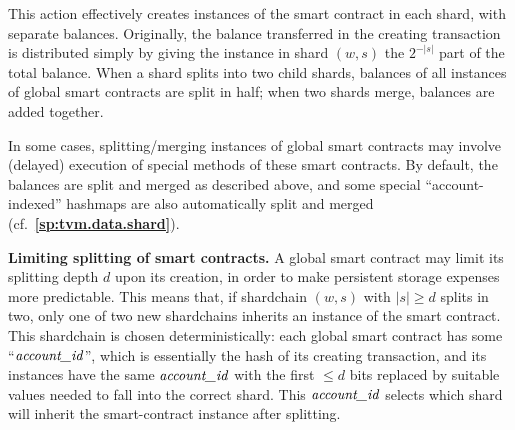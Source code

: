 \documentclass[12pt,oneside]{article}
\def\makepoint#1{\medbreak\noindent{\bf #1.\ }}
\def\nxsubpoint{\refstepcounter{subsubsection}%
  \smallbreak\makepoint{\thesubsubsection}}
\def\refpoint#1{{\rm\textbf{\ref{#1}}}}
\let\ptref=\refpoint
\def\embt(#1.){\textbf{#1.}}
\let\vr=\textit
\def\accountid{\vr{account\_id\/}}
\begin{document}
This action effectively creates instances of the smart contract in
each shard, with separate balances. Originally, the balance
transferred in the creating transaction is distributed simply by
giving the instance in shard $(w,s)$ the $2^{-|s|}$ part of the total
balance. When a shard splits into two child shards, balances of all
instances of global smart contracts are split in half; when two shards
merge, balances are added together.

In some cases, splitting/merging instances of global smart contracts
may involve (delayed) execution of special methods of these smart
contracts. By default, the balances are split and merged as described
above, and some special ``account-indexed'' hashmaps are also
automatically split and merged (cf.~\ptref{sp:tvm.data.shard}).

\nxsubpoint \embt(Limiting splitting of smart contracts.)  A global
smart contract may limit its splitting depth $d$ upon its creation, in
order to make persistent storage expenses more predictable. This means
that, if shardchain $(w,s)$ with $|s|\geq d$ splits in two, only one
of two new shardchains inherits an instance of the smart
contract. This shardchain is chosen deterministically: each global
smart contract has some ``$\accountid$'', which is essentially the
hash of its creating transaction, and its instances have the same
$\accountid$ with the first $\leq d$ bits replaced by suitable values
needed to fall into the correct shard. This $\accountid$ selects which
shard will inherit the smart-contract instance after splitting.
\end{document}
